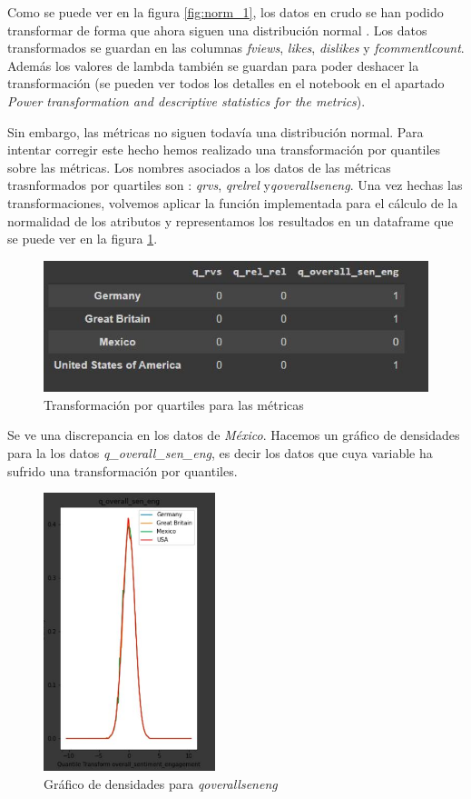 \documentclass[a4paper,12pt]{article}
\begin{document}
Como se puede ver en la figura  \ref{fig:norm_1}, los datos en crudo se han podido transformar de forma que ahora siguen una distribuci\'on normal . Los datos transformados se guardan en las columnas {\itshape fviews}, {\itshape likes}, {\itshape dislikes} y {\itshape fcommentl{\textunderscore}count}. Adem\'as los valores de lambda tambi\'en se guardan para poder deshacer la transformaci\'on (se pueden ver todos los detalles en el notebook en el apartado {\itshape Power transformation and descriptive statistics for the metrics}).

Sin embargo, las m\'etricas no siguen todav\'ia una distribuci\'on normal. Para intentar corregir este hecho hemos realizado una transformaci\'on por quantiles sobre las m\'etricas. Los nombres asociados a los datos de las m\'etricas trasnformados por quartiles son : {\itshape q{\textunderscore}rvs}, {\itshape q{\textunderscore}rel{\textunderscore}rel} y{\itshape q{\textunderscore}overall{\textunderscore}sen{\textunderscore}eng}. Una vez hechas las transformaciones, volvemos aplicar la funci\'on implementada para el c\'alculo de la normalidad de los atributos y representamos los resultados en un dataframe que se puede ver en la figura \ref{fig:quar}.

\begin{figure}[h!]
\centering
\includegraphics[width=12cm]{dataframe_3.JPG}
\caption{Transformaci\'on por quartiles para las m\'etricas}
\label{fig:quar}
\end{figure}

Se ve una discrepancia en los datos de {\itshape M\'exico}. Hacemos un gr\'afico de densidades para la los datos {\itshape q\_overall\_sen\_eng}, es decir los datos que cuya variable  ha sufrido una transformaci\'on por quantiles.

\begin{figure}[h!]
\centering
\includegraphics[width=5cm]{grafica_transformada.JPG}
\caption{Gr\'afico de densidades para {\itshape q{\textunderscore}overall{\textunderscore}sen{\textunderscore}eng}}
\label{fig:quart_2}
\end{figure}
\end{document}
